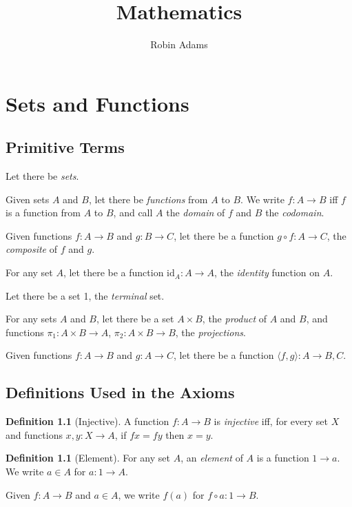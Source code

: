 \documentclass{book}
\title{Mathematics}
\author{Robin Adams}
\theoremstyle{definition}
\newtheorem{df}[ax]{Definition}
\newcommand{\id}[1]{\ensuremath{\mathrm{id}_{#1}}}
\begin{document}
\maketitle
\tableofcontents

\chapter{Sets and Functions}

\section{Primitive Terms}

Let there be \emph{sets}.

Given sets $A$ and $B$, let there be \emph{functions} from $A$ to $B$. We write $f : A \rightarrow B$ iff $f$ is a function from $A$ to $B$, and call $A$ the \emph{domain} of $f$ and $B$ the \emph{codomain}.

Given functions $f : A \rightarrow B$ and $g : B \rightarrow C$, let there be a function $g \circ f : A \rightarrow C$, the \emph{composite} of $f$ and $g$.

For any set $A$, let there be a function $\id{A} : A \rightarrow A$, the \emph{identity} function on $A$.

Let there be a set 1, the \emph{terminal} set.

For any sets $A$ and $B$, let there be a set $A \times B$, the \emph{product} of $A$ and $B$, and functions $\pi_1 : A \times B \rightarrow A$, $\pi_2 : A \times B \rightarrow B$, the \emph{projections}.

Given functions $f : A \rightarrow B$ and $g : A \rightarrow C$, let there be a function $\langle f,g \rangle : A \rightarrow B, C$.

\section{Definitions Used in the Axioms}

\begin{df}[Injective]
A function $f : A \rightarrow B$ is \emph{injective} iff, for every set $X$ and functions $x,y : X \rightarrow A$, if $fx = fy$ then $x = y$.
\end{df}

\begin{df}[Element]
For any set $A$, an \emph{element} of $A$ is a function $1 \rightarrow a$. We write $a \in A$ for $a : 1 \rightarrow A$.

Given $f : A \rightarrow B$ and $a \in A$, we write $f(a)$ for $f \circ a : 1 \rightarrow B$.
\end{df}
\end{document}
